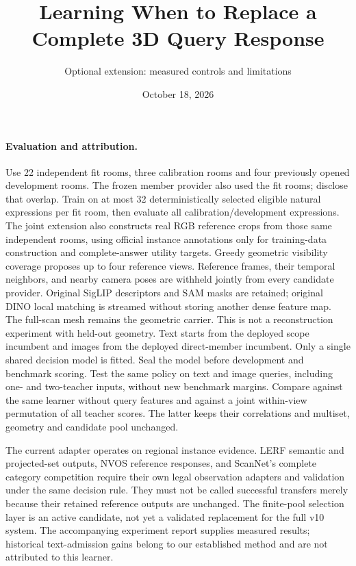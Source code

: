 \documentclass[10pt]{article}
\title{Learning When to Replace a Complete 3D Query Response}
\author{Optional extension: measured controls and limitations}
\date{October 18, 2026}
\begin{document}
\maketitle



\paragraph{Evaluation and attribution.}
Use 22 independent fit rooms, three calibration rooms and four previously opened
development rooms. The frozen member provider also used the fit rooms; disclose
that overlap. Train on at most 32 deterministically selected eligible natural
expressions per fit room, then evaluate all calibration/development expressions.
The joint extension also constructs real RGB reference crops from those same
independent rooms, using official instance annotations only for training-data
construction and complete-answer utility targets. Greedy geometric visibility
coverage proposes up to four reference views. Reference frames, their temporal neighbors, and nearby
camera poses are withheld jointly from every candidate provider. Original
SigLIP descriptors and SAM masks are retained; original DINO local matching is
streamed without storing another dense feature map. The full-scan mesh remains
the geometric carrier. This is not a reconstruction experiment with held-out
geometry. Text starts from the deployed scope incumbent and images from the
deployed direct-member incumbent. Only a single shared decision model is fitted.
Seal the model before development and benchmark scoring. Test the same policy
on text and image queries, including one- and two-teacher inputs, without new
benchmark margins. Compare against the same learner without query features and
against a joint within-view permutation of all teacher scores. The latter keeps
their correlations and multiset, geometry and candidate pool unchanged.

The current adapter operates on regional instance evidence. LERF semantic and
projected-set outputs, NVOS reference responses, and ScanNet's complete category
competition require their own legal observation adapters and validation under
the same decision rule. They must not be called successful transfers merely
because their retained reference outputs are unchanged. The finite-pool
selection layer is an active candidate, not yet a validated replacement for
the full v10 system. The accompanying experiment report supplies measured
results; historical text-admission gains belong to our established method and
are not attributed to this learner.


\end{document}
